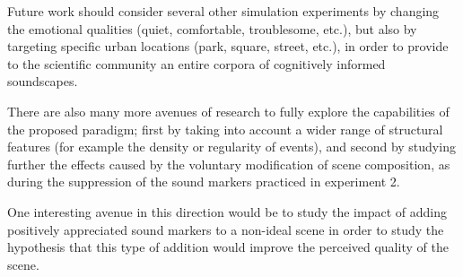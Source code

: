 \documentclass[12pt]{elsarticle}
\newcommand{\etc}{\emph{etc.}}
\begin{document}

Future work should consider several other simulation experiments by changing the emotional qualities (quiet, comfortable, troublesome, etc.), but also by targeting specific urban locations (park, square, street, etc.), in order to provide to the scientific community an entire corpora of cognitively informed soundscapes.



There are also many more avenues of research to fully explore the capabilities of the proposed paradigm; first by taking into account a wider range of structural features (for example the density or regularity of events), and second by studying further the effects caused by the voluntary modification of scene composition, as during the suppression of the sound markers practiced in experiment 2.


One interesting avenue in this direction would be to study the impact of adding positively appreciated sound markers to a non-ideal scene in order to study the hypothesis that this type of addition would improve the perceived quality of the scene.

\end{document}
